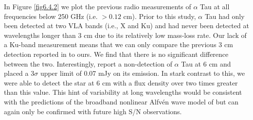 In Figure \ref{fig6.4.2} we plot the previous  radio measurements of $\alpha$ Tau at all frequencies below 250 GHz (i.e. $> 0.12$ cm). Prior to this study, $\alpha$ Tau had only been detected at two VLA bands (i.e., X and Ku) and had never been detected at wavelengths longer than 3 cm due to its relatively low mass-loss rate. Our lack of a Ku-band measurement means that we can only compare the previous 3 cm detection reported in \cite{wood_2007} to ours. We find that there is no significant difference between the two. Interestingly, \cite{wood_2007} report a non-detection of $\alpha$ Tau at 6 cm and placed a 3$\sigma$ upper limit of 0.07 mJy on its emission. In stark contrast to this, we were able to detect the star at 6 cm with a flux density over two times greater than this value. This hint of variability at long wavelengths would be consistent with the predictions of the broadband nonlinear Alfv\'{e}n wave model of \cite{airapetian_2010} but can again only be confirmed with future high S/N observations.

